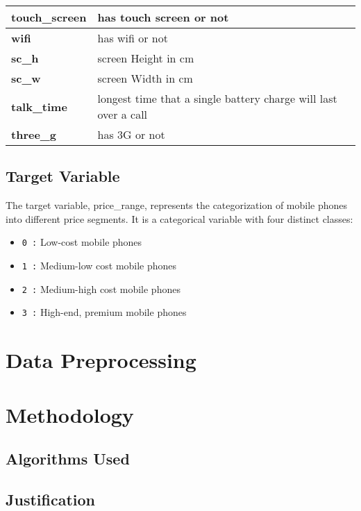 \documentclass[12pt]{report}
\begin{document}
\begin{table}[H]
\begin{tabular}{ll}
		\midrule
		\textbf{touch\_screen}  & has touch screen or not                                         \\
		\midrule
		\textbf{wifi}           & has wifi or not                                                 \\
		\midrule
		\textbf{sc\_h}          & screen Height in cm                                             \\
		\midrule
		\textbf{sc\_w}          & screen Width in cm                                              \\
		\midrule
		\textbf{talk\_time}     & longest time that a single battery charge will last over a call \\
		\midrule
		\textbf{three\_g}       & has 3G or not                                                   \\
		\bottomrule
	\end{tabular}
\end{table}
\section{Target Variable}
The target variable, price\_range, represents the categorization of mobile phones into different price segments. It is a categorical variable with four distinct classes:
\vspace{-1.25em}
\begin{itemize}
	\setlength\itemsep{-1.05em}
	\item{\texttt{0 :}} Low-cost mobile phones
	\item{\texttt{1 :}} Medium-low cost mobile phones
	\item{\texttt{2 :}} Medium-high cost mobile phones
	\item{\texttt{3 :}} High-end, premium mobile phones
\end{itemize}

\chapter{Data Preprocessing}

\chapter{Methodology}
\section{Algorithms Used}
\section{Justification}
\end{document}
